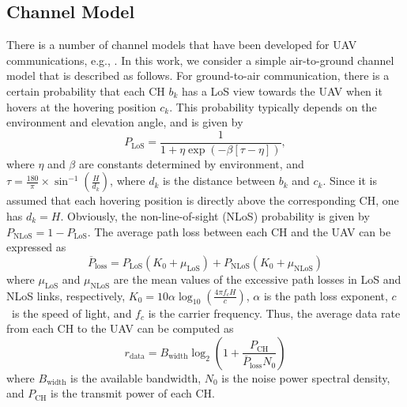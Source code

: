 \documentclass[journal]{IEEEtran}
\begin{document}
	\subsection{Channel Model}
	There is a number of channel models that have been developed for UAV communications, e.g., \cite{Z. Ma, Z. Lian}. In this work, we consider a simple air-to-ground channel model that is described as follows.
	For ground-to-air communication, there is a certain probability that each CH $b_k$ has a LoS view towards the UAV when it hovers at the hovering position $c_k$. This probability typically depends on the environment and elevation angle, and is given by \cite{M. B. Ghorbel}
	\begin{equation}
	    P_{\text{LoS}} = \frac{1}{1+\eta\exp{\left(-\beta[\tau-\eta]\right)}},
	\end{equation}
	where $\eta$ and $\beta$ are constants determined by environment, and $\tau=\frac{180}{\pi}\times\sin^{-1}\left({\frac{H}{d_k}}\right)$, where $d_k$ is the distance between $b_k$ and $c_k$. Since it is assumed that each hovering position is directly above the corresponding CH, one has $d_k=H$. Obviously, the non-line-of-sight (NLoS) probability is given by $P_{\text{NLoS}} = 1-P_{\text{LoS}}$. The average path loss between each CH and the UAV can be expressed as \cite{M. B. Ghorbel}
	\begin{equation}
	    \overline{P}_{\text{loss}} = P_{\text{LoS}} \left(K_0 + \mu_{\text{LoS}} \right) + P_{\text{NLoS}}\left(K_0 + \mu_{\text{NLoS}} \right)
	\end{equation}
	where $\mu_{\text{LoS}}$ and $\mu_{\text{NLoS}}$ are the mean values of the excessive path losses in LoS and NLoS links, respectively, $K_0 = 10\alpha \log_{10}\left(\frac{4\pi f_c H}{c}\right)$, $\alpha$ is the path loss exponent, $c$\ is the speed of light, and $f_c$ is the carrier frequency. Thus, the average data rate from each CH to the UAV can be computed as \cite{M. B. Ghorbel}
	\begin{equation}
	    r_{\text{data}} = B_{\text{width}}\log_2\left(1+\frac{P_{\text{CH}}}{\overline{P}_{\text{loss}}N_{0}}\right)
	\end{equation}
	where $ B_{\text{width}}$ is the available bandwidth, $N_0$ is the noise power spectral density, and $P_{\text{CH}}$ is the transmit power of each CH.
		
\end{document}
